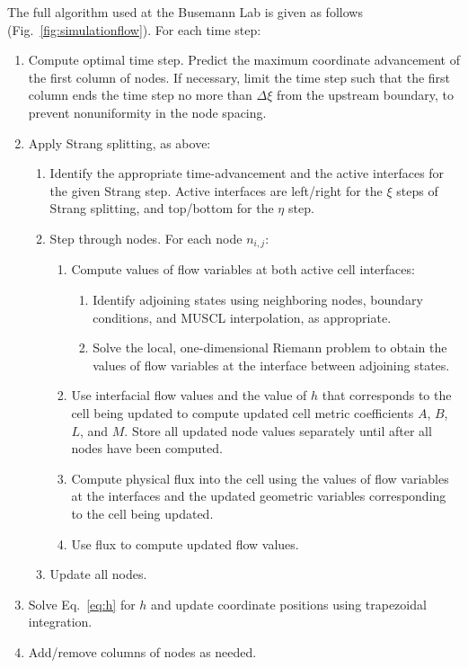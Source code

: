 \documentclass[12pt,letterpaper]{article}
\begin{document}
The full algorithm used at the Busemann Lab is given as follows (Fig.~\ref{fig:simulationflow}). For each time step:

\begin{enumerate}
  \item Compute optimal time step\cite{huiviscous07}. Predict the maximum coordinate advancement of the first column of nodes. If necessary, limit the time step such that the first column ends the time step no more than $\Delta\xi$ from the upstream boundary, to prevent nonuniformity in the node spacing.
  \item Apply Strang splitting, as above:
  \begin{enumerate} 
    \item Identify the appropriate time-advancement and the active interfaces for the given Strang step. Active interfaces are left/right for the $\xi$ steps of Strang splitting, and top/bottom for the $\eta$ step.
    \item Step through nodes. For each node $n_{i,j}$:
    \begin{enumerate}
      \item Compute values of flow variables at both active cell interfaces:
      \begin{enumerate}
         \item Identify adjoining states using neighboring nodes, boundary conditions, and MUSCL interpolation, as appropriate.
         \item Solve the local, one-dimensional Riemann problem to obtain the values of flow variables at the interface between adjoining states.
      \end{enumerate}
      \item Use interfacial flow values and the value of $h$ that corresponds to the cell being updated to compute updated cell metric coefficients $A$, $B$, $L$, and $M$. Store all updated node values separately until after all nodes have been computed.
      \item Compute physical flux into the cell using the values of flow variables at the interfaces and the updated geometric variables corresponding to the cell being updated.
      \item Use flux to compute updated flow values. 
    \end{enumerate}
    \item Update all nodes.
  \end{enumerate}
  \item Solve Eq.~\ref{eq:h} for $h$ and update coordinate positions using trapezoidal integration.
  \item Add/remove columns of nodes as needed.
\end{enumerate}
                        
\end{document}
